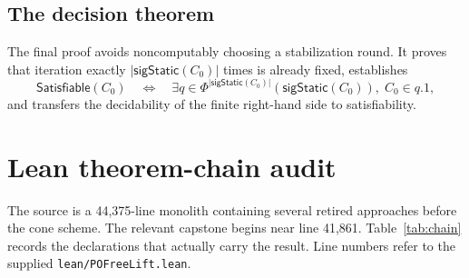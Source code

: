 \documentclass[11pt]{article}
\newcommand{\code}[1]{\texttt{#1}}
\begin{document}
\begin{center}
\end{center}

\subsection{The decision theorem}

The final proof avoids noncomputably choosing a stabilization round. It proves that
iteration exactly $|\mathsf{sigStatic}(C_0)|$ times is already fixed, establishes
\[
\mathsf{Satisfiable}(C_0)\quad\Longleftrightarrow\quad
\exists q\in\Phi^{|\mathsf{sigStatic}(C_0)|}(\mathsf{sigStatic}(C_0)),
\;C_0\in q.1,
\]
and transfers the decidability of the finite right-hand side to satisfiability.

\section{Lean theorem-chain audit}

The source is a 44,375-line monolith containing several retired approaches before the
cone scheme. The relevant capstone begins near line 41,861. Table~\ref{tab:chain}
records the declarations that actually carry the result. Line numbers refer to the
supplied \code{lean/POFreeLift.lean}.
\end{document}
